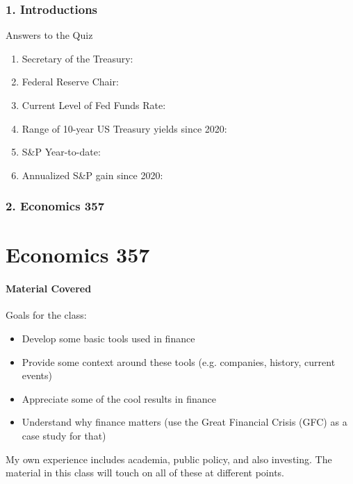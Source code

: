\documentclass{beamer}
\begin{document}
\begin{frame}[t]
    \frametitle{1. Introductions}

    Answers to the Quiz
    \begin{enumerate}
        \item Secretary of the Treasury:
        \item Federal Reserve Chair:
        \item Current Level of Fed Funds Rate: 
        \item Range of 10-year US Treasury yields since 2020: 
        \item S\&P Year-to-date:
        \item Annualized S\&P gain since 2020: 
    \end{enumerate}

\end{frame}

\begin{frame}[t]
    \frametitle{2. Economics 357}
    \section{Economics 357}
    \framesubtitle{Material Covered}

    Goals for the class:
    \begin{itemize}
        \item Develop some basic tools used in finance
        \item Provide some context around these tools (e.g. companies, history, current events)
        \item Appreciate some of the cool results in finance
        \item Understand why finance matters (use the Great Financial Crisis (GFC) as a case study for that)
    \end{itemize}
    \vspace{1em}

    My own experience includes academia, public policy, and also investing.   The material in this class will touch on all of these at different points.

\end{frame}
\end{document}
